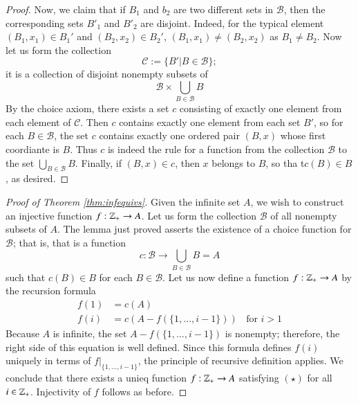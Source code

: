\documentclass[12pt, a4paper, oneside, openright, titlepage]{book}
\begin{document}
\begin{appendices}
\begin{proof}
        Now, we claim that if $B_1$ and $b_2$ are two different sets in $\mathscr{B}$, then the corresponding sets $B'_1$ and $B'_2$ are disjoint. Indeed, for the typical element $(B_1,x_1) \in B_1'$ and $(B_2,x_2) \in B_2'$, $(B_1,x_1) \neq (B_2,x_2)$ as $B_1 \neq B_2$. Now let us form the collection \begin{equation*}
            \mathscr{C} :=\{B'\vert B \in \mathscr{B}\};
        \end{equation*}
        it is a collection of disjoint nonempty subsets of \begin{equation*}
            \mathscr{B}\times \bigcup\limits_{B\in \mathscr{B}}B
        \end{equation*}
        By the choice axiom, there exists a set $c$ consisting of exactly one element from each element of $\mathscr{C}$. Then $c$ contains exactly one element from each set $B'$, so for each $B \in \mathscr{B}$, the set $c$ contains exactly one ordered pair $(B,x)$ whose first coordiante is $B$. Thus $c$ is indeed the rule for a function from the collection $\mathscr{B}$ to the set $\bigcup_{B\in\mathscr{B}}B$. Finally, if $(B,x) \in c$, then $x$ belongs to $B$, so tha t$c(B) \in B$, as desired.
    \end{proof}




    \begin{proof}[Proof of Theorem \ref{thm:infequivs}]
        Given the infinite set $A$, we wish to construct an injective function $f:\mathbb Z_+\rightarrow A$. Let us form the collection $\mathscr{B}$ of all nonempty subsets of $A$. The lemma just proved asserts the existence of a choice function for $\mathscr{B}$; that is, that is a function \begin{equation*}
            c:\mathscr{B}\rightarrow \bigcup\limits_{B\in\mathscr{B}}B = A
        \end{equation*}
        such that $c(B) \in B$ for each $B \in \mathscr{B}$. Let us now define a function $f:\mathbb Z_+\rightarrow A$ by the recursion formula \begin{align*}
            f(1) &= c(A) \\
            f(i) &= c(A-f(\{1,...,i-1\}))\;\;\text{ for } i >1
        \end{align*}
        Because $A$ is infinite, the set $A-f(\{1,...,i-1\})$ is nonempty; therefore, the right side of this equation is well defined. Since this formula defines $f(i)$ uniquely in terms of $f\rvert_{\{1,...,i-1\}}$, the principle of recursive definition applies. We conclude that there exists a unieq function $f:\mathbb Z_+\rightarrow A$ satisfying $(\star)$ for all $i \in \mathbb Z_+$. Injectivity of $f$ follows as before.
    \end{proof}




\end{appendices}
\end{document}
